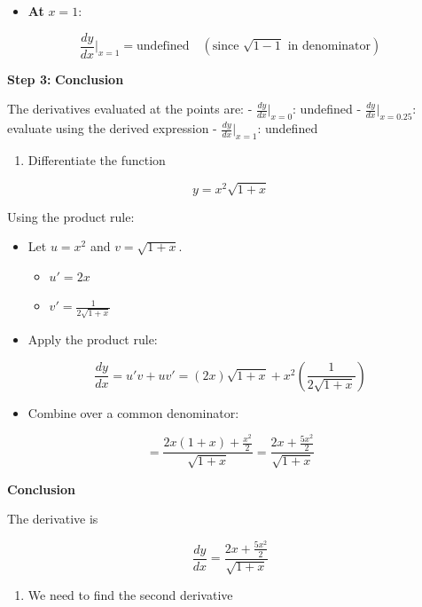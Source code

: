 \documentclass[
]{book}
\providecommand{\tightlist}{%
  \setlength{\itemsep}{0pt}\setlength{\parskip}{0pt}}
\begin{document}
\begin{itemize}
\tightlist
\item
  \textbf{At} \(x = 1\):
\end{itemize}

\[
    \frac{dy}{dx}\bigg|_{x=1} = \text{undefined} \quad (\text{since } \sqrt{1 - 1} \text{ in denominator})
\]

\textbf{Step 3:} \textbf{Conclusion}

The derivatives evaluated at the points are: -
\(\frac{dy}{dx}\bigg|_{x=0}\): undefined -
\(\frac{dy}{dx}\bigg|_{x=0.25}\): evaluate using the derived expression
- \(\frac{dy}{dx}\bigg|_{x=1}\): undefined

\begin{enumerate}
\def\labelenumi{\arabic{enumi}.}
\setcounter{enumi}{7}
\tightlist
\item
  Differentiate the function
\end{enumerate}

\[
y = x^2\sqrt{1 + x}
\]

Using the product rule:

\begin{itemize}
\item
  Let \(u = x^2\) and \(v = \sqrt{1 + x}\).

  \begin{itemize}
  \tightlist
  \item
    \(u' = 2x\)
  \item
    \(v' = \frac{1}{2\sqrt{1 + x}}\)
  \end{itemize}
\item
  Apply the product rule:
\end{itemize}

\[
\frac{dy}{dx} = u'v + uv' = (2x)\sqrt{1 + x} + x^2\left(\frac{1}{2\sqrt{1 + x}}\right)
\]

\begin{itemize}
\tightlist
\item
  Combine over a common denominator:
\end{itemize}

\[
= \frac{2x(1 + x) + \frac{x^2}{2}}{\sqrt{1 + x}} = \frac{2x + \frac{5x^2}{2}}{\sqrt{1 + x}}
\]

\textbf{Conclusion}

The derivative is

\[
\frac{dy}{dx} = \frac{2x + \frac{5x^2}{2}}{\sqrt{1 + x}}
\]

\begin{enumerate}
\def\labelenumi{\arabic{enumi}.}
\setcounter{enumi}{8}
\tightlist
\item
  We need to find the second derivative
\end{enumerate}
\end{document}
